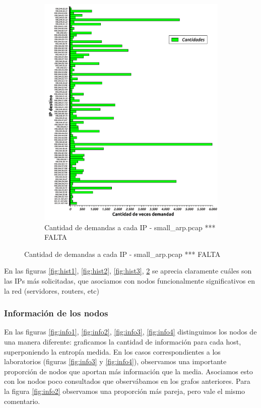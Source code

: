 \begin{figure}[H]
\begin{subfigure}[H]{0.5\textwidth}
                \includegraphics[width=1\textwidth]{graficos/cantidadConsultasCasaJulian.pdf}
                \caption{Cantidad de demandas a cada IP - small\_arp.pcap *** FALTA}
                \label{fig:hist4}
        \end{subfigure}
\end{figure}

En las figuras \ref{fig:hist1}, \ref{fig:hist2}, \ref{fig:hist3}, \ref{fig:hist4} se aprecia claramente cuáles son las IPs más solicitadas, que asociamos con nodos funcionalmente significativos en la red (servidores, routers, etc)

\subsubsection{Informaci\'on de los nodos}

En las figuras \ref{fig:info1}, \ref{fig:info2}, \ref{fig:info3}, \ref{fig:info4} distinguimos los nodos de una manera diferente:
graficamos la cantidad de información para cada host, superponiendo la entropía medida. En los casos correspondientes a los laboratorios (figuras \ref{fig:info3} y \ref{fig:info4}), observamos una importante proporción de nodos que aportan más información que la media. Asociamos esto con los nodos poco consultados que observábamos en los grafos anteriores. Para la figura \ref{fig:info2} observamos una proporción más pareja, pero vale el mismo comentario.

